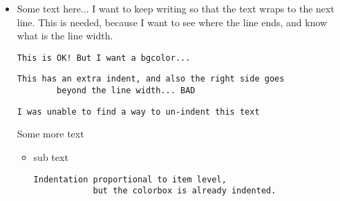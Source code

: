 \documentclass[]{article}
\begin{document}
	\begin{itemize}
	\item
		Some text here... I want to keep writing so that the text wraps to the next line.
		This is needed, because I want to see where the line ends, and know what is the line width.
		
		\begin{Verbatim}[gobble=2]
		This is OK! But I want a bgcolor...
		\end{Verbatim}
		
		\vbox\bgroup
		\begin{Verbatim}[gobble=2]
		This has an extra indent, and also the right side goes
		beyond the line width... BAD
		\end{Verbatim}
		\egroup{} \colorbox{bgcolor}{}
		
		\vbox\bgroup
		\begin{Verbatim}[gobble=2]
		I was unable to find a way to un-indent this text
		\end{Verbatim}
		\egroup{} \colorbox{bgcolor}{\parbox{\linewidth}{}}
	
		Some more text
		
		\begin{itemize}
		\item
			sub text
			
			\vbox\bgroup
			\begin{Verbatim}[gobble=3]
			Indentation proportional to item level,
			but the colorbox is already indented.
			\end{Verbatim}
			\egroup{} \colorbox{bgcolor}{\parbox{\linewidth}{}}
	
		\end{itemize}
	\end{itemize}
\end{document}
